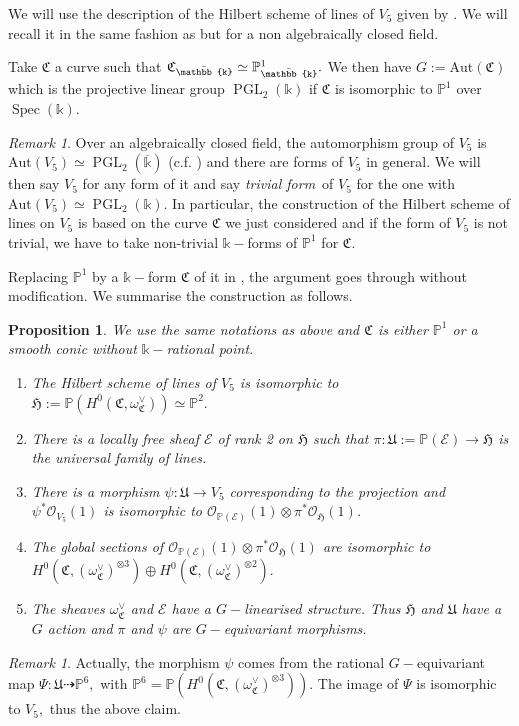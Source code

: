 \documentclass{amsart}
\theoremstyle{plain}%
\newtheorem{prop}[subsubsection]{Proposition}
\theoremstyle{remark}
\newtheorem{rmq}[subsubsection]{Remark}
\theoremstyle{definition}
\newcommand{\cE}{\mathcal{E}}
\newcommand{\cO}{\mathcal{O}}
\newcommand{\ek}{\mathbb{k}}
\newcommand{\eP}{\mathbb{P}}
\newcommand{\fC}{\mathfrak{C}}
\newcommand{\fH}{\mathfrak{H}}
\newcommand{\fU}{\mathfrak{U}}
\newcommand{\Aut}{\mathrm{Aut}}
\newcommand{\PGL}{\operatorname{PGL}}
\newcommand{\Spec}[1]{\operatorname{Spec}\left(#1\right)}
\begin{document}
We will use the description of the Hilbert scheme of lines of $V_5$ given by \cite{FN89}. We will recall it in the same fashion as \cite[Section 1]{DFK25_fano22} but for a non algebraically closed field.



Take $\fC$ a curve such that $\fC_{\bar \ek} \simeq \eP^1_{\bar \ek}.$ We then have $G := \Aut(\fC)$ which is the projective linear group $\operatorname{PGL}_2(\ek)$ if $\fC$ is isomorphic to $\eP^1$ over $\Spec{\ek}$.

\begin{rmq}
Over an algebraically closed field, the automorphism group of $V_5$ is $\Aut(V_5)\simeq \PGL_2(\overline{\ek})$ (c.f. \cite[Theorem 1.1.2]{KPS18}) and there are forms of $V_5$ in general. We will then say $V_5$ for any form of it and say \emph{trivial form}\ of $V_5$ for the one with $\Aut(V_5)\simeq \PGL_2(\ek).$ In particular, the construction of the Hilbert scheme of lines on $V_5$ is based on the curve $\fC$ we just considered and if the form of $V_5$ is not trivial, we have to take non-trivial $\ek-$forms of $\eP^1$ for $\fC.$
\end{rmq}
Replacing $\eP^1$ by a $\ek-$form $\fC$ of it in \cite{DFK25_fano22}, the argument goes through without modification. We summarise the construction as follows.

\begin{prop}\label{PROP - correspondance incidence Fano quintique}We use the same notations as above and $\fC$ is either $\eP^1$ or a smooth conic without $\ek-$rational point.
\begin{enumerate}
    \item The Hilbert scheme of lines of $V_5$ is isomorphic to $\fH:= \eP(H^0(\fC,\omega_\fC^\vee)) \simeq \eP^2.$
    \item There is a locally free sheaf $\cE$ of rank 2 on $\fH$ such that $\pi : \fU := \eP(\cE) \to \fH$ is the universal family of lines.
    \item There is a morphism $\psi : \fU \to V_5$ corresponding to the projection and $\psi^\ast\cO_{V_5}(1)$ is isomorphic to $\cO_{\eP(\cE)}(1)\otimes\pi^\ast\cO_\fH(1)$.
    \item The global sections of $\cO_{\eP(\cE)}(1)\otimes\pi^\ast\cO_\fH(1)$ are isomorphic to $H^0(\fC,(\omega_\fC^\vee)^{\otimes 3}) \oplus H^0(\fC,(\omega_\fC^\vee)^{\otimes 2}).$
    \item The sheaves $\omega_\fC^\vee$ and $\cE$ have a $G-$linearised structure. Thus $\fH$ and $\fU$ have a $G$ action and $\pi$ and $\psi$ are $G-$equivariant morphisms.
\end{enumerate}
\end{prop}
\begin{rmq}\label{RMQ - morphisme de U vers P6}
Actually, the morphism $\psi$ comes from the rational $G-$equivariant map $\Psi : \fU \dashrightarrow \eP^6,$ with $\eP^6 = \eP(H^0(\fC,(\omega_\fC^\vee)^{\otimes 3})).$ The image of $\Psi$ is isomorphic to $V_5,$ thus the above claim.
\end{rmq}
\end{document}
